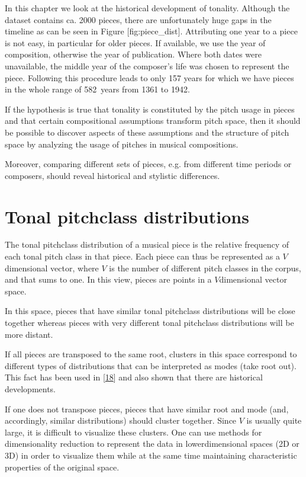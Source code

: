 \documentclass[letterpaper,10pt,english]{sphinxmanual}
\begin{document}
\sphinxAtStartPar
In this chapter we look at the historical development of tonality.
Although the dataset contains ca. 2000 pieces, there are unfortunately
huge gaps in the timeline as can be seen in Figure {[}fig:piece\_dist{]}.
Attributing one year to a piece is not easy, in particular for older
pieces. If available, we use the year of composition, otherwise the year
of publication. Where both dates were unavailable, the middle year of
the composer’s life was chosen to represent the piece. Following this
procedure leads to only 157 years for which we have pieces in the whole
range of 582 years from 1361 to 1942.

\sphinxAtStartPar
If the hypothesis is true that tonality is constituted by the pitch
usage in pieces and that certain compositional assumptions transform
pitch space, then it should be possible to discover aspects of these
assumptions and the structure of pitch space by analyzing the usage of
pitches in musical compositions.

\sphinxAtStartPar
Moreover, comparing different sets of pieces, e.g. from different time
periods or composers, should reveal historical and stylistic
differences.


\chapter{Tonal pitch\sphinxhyphen{}class distributions}
\label{\detokenize{5_notes:tonal-pitch-class-distributions}}
\sphinxAtStartPar
The tonal pitch\sphinxhyphen{}class distribution of a musical piece is the relative
frequency of each tonal pitch class in that piece. Each piece can thus
be represented as a \(V\)\sphinxhyphen{}dimensional vector, where \(V\) is the
number of different pitch classes in the corpus, and that sums to one.
In this view, pieces are points in a \(V\)\sphinxhyphen{}dimensional vector space.

\sphinxAtStartPar
In this space, pieces that have similar tonal pitch\sphinxhyphen{}class distributions
will be close together whereas pieces with very different tonal
pitch\sphinxhyphen{}class distributions will be more distant.

\sphinxAtStartPar
If all pieces are transposed to the same root, clusters in this space
correspond to different types of distributions that can be interpreted
as modes (take root out). This fact has been used in
{[}\hyperlink{cite.8_bibliography:id64}{18}{]}
and also shown that there are historical developments.

\sphinxAtStartPar
If one does not transpose pieces, pieces that have similar root and mode
(and, accordingly, similar distributions) should cluster together. Since
\(V\) is usually quite large, it is difficult to visualize these
clusters. One can use methods for dimensionality reduction to represent
the data in lower\sphinxhyphen{}dimensional spaces (2D or 3D) in order to visualize
them while at the same time maintaining characteristic properties of the
original space.
\end{document}

